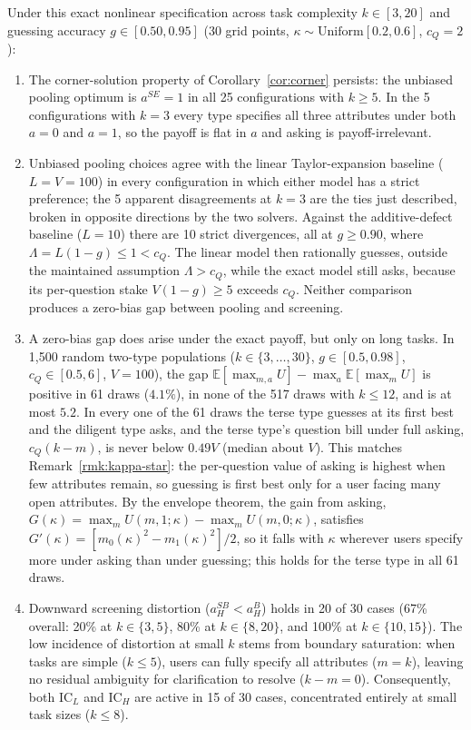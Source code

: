 \documentclass[11pt]{article}
\begin{document}
Under this exact nonlinear specification across task complexity $k \in [3, 20]$ and guessing accuracy $g \in [0.50, 0.95]$ (30 grid points, $\kappa \sim \text{Uniform}[0.2, 0.6]$, $c_Q = 2$):
\begin{enumerate}[leftmargin=*]
\item The corner-solution property of Corollary~\ref{cor:corner} persists: the unbiased pooling optimum is $a^{SE} = 1$ in all 25 configurations with $k \ge 5$. In the 5 configurations with $k = 3$ every type specifies all three attributes under both $a = 0$ and $a = 1$, so the payoff is flat in $a$ and asking is payoff-irrelevant.
\item Unbiased pooling choices agree with the linear Taylor-expansion baseline ($L = V = 100$) in every configuration in which either model has a strict preference; the 5 apparent disagreements at $k = 3$ are the ties just described, broken in opposite directions by the two solvers. Against the additive-defect baseline ($L = 10$) there are 10 strict divergences, all at $g \ge 0.90$, where $\Lambda = L(1-g) \le 1 < c_Q$. The linear model then rationally guesses, outside the maintained assumption $\Lambda > c_Q$, while the exact model still asks, because its per-question stake $V(1-g) \ge 5$ exceeds $c_Q$. Neither comparison produces a zero-bias gap between pooling and screening.
\item A zero-bias gap does arise under the exact payoff, but only on long tasks. In 1{,}500 random two-type populations ($k \in \{3,\dots,30\}$, $g \in [0.5, 0.98]$, $c_Q \in [0.5, 6]$, $V = 100$), the gap $\mathbb{E}[\max_{m,a} U] - \max_a \mathbb{E}[\max_m U]$ is positive in 61 draws ($4.1\%$), in none of the 517 draws with $k \le 12$, and is at most $5.2$. In every one of the 61 draws the terse type guesses at its first best and the diligent type asks, and the terse type's question bill under full asking, $c_Q(k - m)$, is never below $0.49V$ (median about $V$). This matches Remark~\ref{rmk:kappa-star}: the per-question value of asking is highest when few attributes remain, so guessing is first best only for a user facing many open attributes. By the envelope theorem, the gain from asking, $G(\kappa) = \max_m U(m,1;\kappa) - \max_m U(m,0;\kappa)$, satisfies $G'(\kappa) = [m_0(\kappa)^2 - m_1(\kappa)^2]/2$, so it falls with $\kappa$ wherever users specify more under asking than under guessing; this holds for the terse type in all 61 draws.
\item Downward screening distortion ($a_H^{SB} < a_H^B$) holds in 20 of 30 cases (67\% overall: 20\% at $k \in \{3, 5\}$, 80\% at $k \in \{8, 20\}$, and 100\% at $k \in \{10, 15\}$). The low incidence of distortion at small $k$ stems from boundary saturation: when tasks are simple ($k \le 5$), users can fully specify all attributes ($m = k$), leaving no residual ambiguity for clarification to resolve ($k - m = 0$). Consequently, both $\text{IC}_L$ and $\text{IC}_H$ are active in 15 of 30 cases, concentrated entirely at small task sizes ($k \le 8$).
\end{enumerate}
\end{document}
